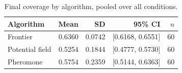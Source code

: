 \begin{table}[t]
\centering
\caption{Final coverage by algorithm, pooled over all conditions.}
\label{tab:descriptive-coverage}
\begin{tabular}{lrrrr}
\toprule
Algorithm & Mean & SD & 95\% CI & $n$ \\
\midrule
Frontier & 0.6360 & 0.0742 & [0.6168, 0.6551] & 60 \\
Potential field & 0.5254 & 0.1844 & [0.4777, 0.5730] & 60 \\
Pheromone & 0.5754 & 0.2359 & [0.5144, 0.6363] & 60 \\
\bottomrule
\end{tabular}
\end{table}
